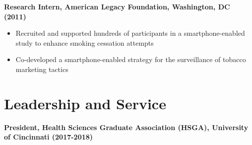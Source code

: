 \documentclass[10pt,a4paper,]{article}
\providecommand{\tightlist}{%
  \setlength{\itemsep}{0pt}\setlength{\parskip}{0pt}}
\begin{document}
\textbf{Research Intern, American Legacy Foundation, Washington, DC
(2011)}

\begin{itemize}
\tightlist
\item
  Recruited and supported hundreds of participants in a
  smartphone-enabled study to enhance smoking cessation attempts
\item
  Co-developed a smartphone-enabled strategy for the surveillance of
  tobacco marketing tactics
\end{itemize}

\section{Leadership and Service}\label{leadership-and-service}

\textbf{President, Health Sciences Graduate Association (HSGA),
University of Cincinnati (2017-2018)}
\end{document}
